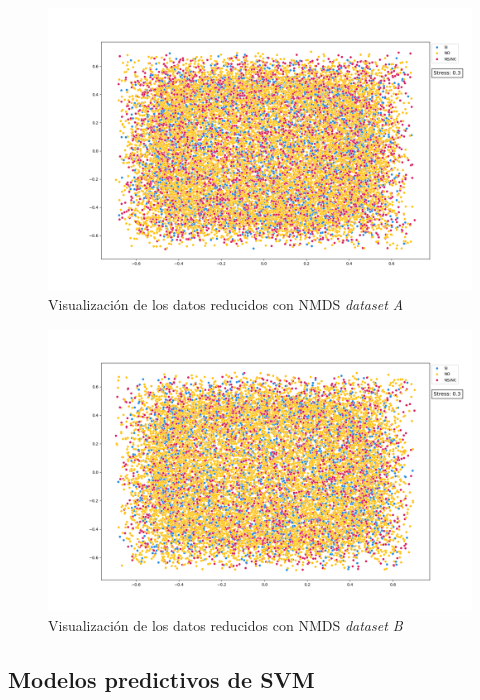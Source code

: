 \documentclass[10 pt]{article}
\begin{document}
\begin{figure}[H]
    \begin{center}
    \includegraphics[scale=.4]{images/nmds_a.png}
    \caption{Visualización de los datos reducidos con NMDS \textit{dataset A}}
    \label{nmds_a}
    \end{center}
    \end{figure}


\begin{figure}[H]
    \begin{center}
    \includegraphics[scale=.4]{images/nmds_b.png}
    \caption{Visualización de los datos reducidos con NMDS  \textit{dataset B}}
    \label{nmds_b}
    \end{center}
    \end{figure}    

\subsection{Modelos predictivos de SVM}
\end{document}
